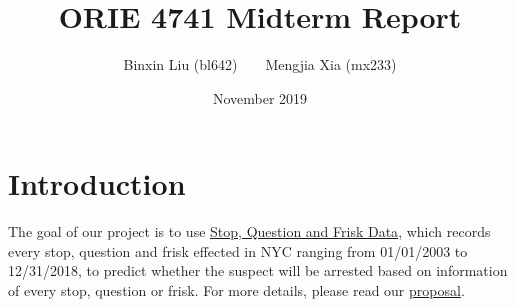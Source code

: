 \documentclass[letterpaper, twocolumn]{article}
\title{ORIE 4741 Midterm Report}
\author{Binxin Liu (bl642)~~~~Mengjia Xia (mx233)}
\date{November 2019}
\begin{document}
\maketitle










\section{Introduction}


The goal of our project is to use \href{https://www1.nyc.gov/site/nypd/stats/reports-analysis/stopfrisk.page}{Stop, Question and Frisk Data}, which records every stop, question and frisk effected in NYC ranging from 01/01/2003 to 12/31/2018, to predict whether the suspect will be arrested based on information of every stop, question or frisk. For more details, please read our \href{https://github.com/Apairery/ORIE4741-ArrestsDataSet}{proposal}.%
\end{document}
